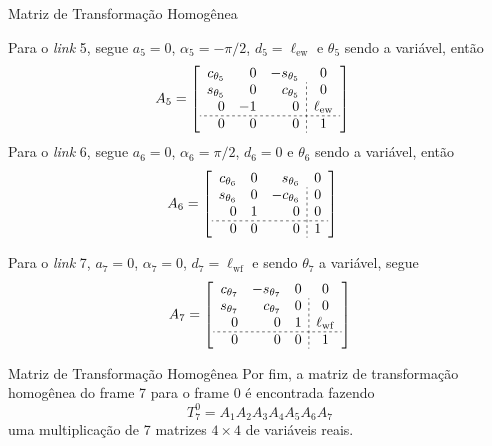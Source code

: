 \documentclass[aspectratio=169]{beamer}
\begin{document}
\begin{frame}{Matriz de Transformação Homogênea}
\begin{minipage}{0.48\textwidth}
Para o \textit{link} 5, segue $a_5 = 0$, $\alpha_5 = -\pi/2$, $d_5=\ell_\mathrm{ew}$ e $\theta_5$ sendo a variável, então
\begin{align*}
    A_5 &=
    \left[ 
    \begin{array}{rrr;{2pt/2pt}c}
        c_{\theta_5} & 0 & -s_{\theta_5} & 0 \\
        s_{\theta_5} & 0 &  c_{\theta_5} & 0 \\
        0 & -1 & 0 &  \ell_\mathrm{ew} \\
        \hdashline[2pt/2pt]
        0 & 0 & 0 & 1
    \end{array}
    \right]
\end{align*}
Para o \textit{link} 6, segue $a_6 = 0$, $\alpha_6 = \pi/2$, $d_6=0$ e $\theta_6$ sendo a variável, então
\begin{align*}
    A_6 &=
    \left[ 
    \begin{array}{rrr;{2pt/2pt}c}
        c_{\theta_6} & 0 &  s_{\theta_6} & 0 \\
        s_{\theta_6} & 0 & -c_{\theta_6} & 0 \\
        0 & 1 & 0 &  0 \\
        \hdashline[2pt/2pt]
        0 & 0 & 0 & 1
    \end{array}
    \right]
\end{align*}
\end{minipage}
\hfill
\begin{minipage}{0.48\textwidth}
Para o \textit{link} 7, $a_7 = 0$, $\alpha_7 = 0$, $d_7=\ell_\mathrm{wf}$ e sendo $\theta_7$ a variável, segue
    \begin{align*}
        A_7 =
        \left[ 
    \begin{array}{rrr;{2pt/2pt}c}
        c_{\theta_7} & -s_{\theta_7} & 0 & 0 \\
        s_{\theta_7} &  c_{\theta_7} & 0 & 0 \\
        0 & 0 & 1 & \ell_\mathrm{wf} \\
        \hdashline[2pt/2pt]
        0 & 0 & 0 & 1
    \end{array}
    \right]
    \end{align*}
\end{minipage}
\end{frame}
\begin{frame}{Matriz de Transformação Homogênea}
    Por fim, a matriz de transformação homogênea do frame 7 para o frame 0 é encontrada fazendo
    \begin{equation}
        T_7^0 = A_1 A_2 A_3 A_4 A_5 A_6 A_7
    \end{equation}
uma multiplicação de 7 matrizes $4\times4$ de variáveis reais.
\end{frame}
\end{document}
